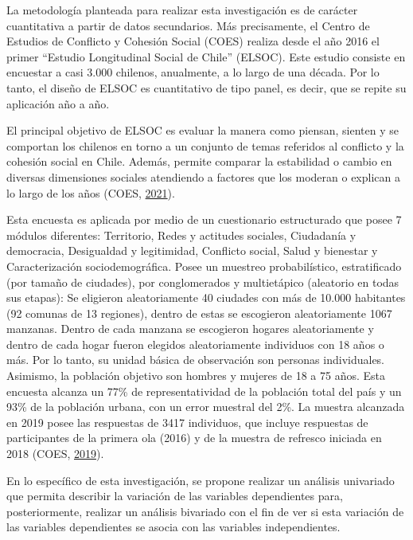 \documentclass[
]{article}
\begin{document}
La metodología planteada para realizar esta investigación es de carácter
cuantitativa a partir de datos secundarios. Más precisamente, el Centro
de Estudios de Conflicto y Cohesión Social (COES) realiza desde el año
2016 el primer ``Estudio Longitudinal Social de Chile'' (ELSOC). Este
estudio consiste en encuestar a casi 3.000 chilenos, anualmente, a lo
largo de una década. Por lo tanto, el diseño de ELSOC es cuantitativo de
tipo panel, es decir, que se repite su aplicación año a año.

El principal objetivo de ELSOC es evaluar la manera como piensan,
sienten y se comportan los chilenos en torno a un conjunto de temas
referidos al conflicto y la cohesión social en Chile. Además, permite
comparar la estabilidad o cambio en diversas dimensiones sociales
atendiendo a factores que los moderan o explican a lo largo de los años
(COES, \protect\hyperlink{ref-coes_Estudio_2021}{2021}).

Esta encuesta es aplicada por medio de un cuestionario estructurado que
posee 7 módulos diferentes: Territorio, Redes y actitudes sociales,
Ciudadanía y democracia, Desigualdad y legitimidad, Conflicto social,
Salud y bienestar y Caracterización sociodemográfica. Posee un muestreo
probabilístico, estratificado (por tamaño de ciudades), por
conglomerados y multietápico (aleatorio en todas sus etapas): Se
eligieron aleatoriamente 40 ciudades con más de 10.000 habitantes (92
comunas de 13 regiones), dentro de estas se escogieron aleatoriamente
1067 manzanas. Dentro de cada manzana se escogieron hogares
aleatoriamente y dentro de cada hogar fueron elegidos aleatoriamente
individuos con 18 años o más. Por lo tanto, su unidad básica de
observación son personas individuales. Asimismo, la población objetivo
son hombres y mujeres de 18 a 75 años. Esta encuesta alcanza un 77\% de
representatividad de la población total del país y un 93\% de la
población urbana, con un error muestral del 2\%. La muestra alcanzada en
2019 posee las respuestas de 3417 individuos, que incluye respuestas de
participantes de la primera ola (2016) y de la muestra de refresco
iniciada en 2018 (COES,
\protect\hyperlink{ref-coes_Radiografia_2019}{2019}).

En lo específico de esta investigación, se propone realizar un análisis
univariado que permita describir la variación de las variables
dependientes para, posteriormente, realizar un análisis bivariado con el
fin de ver si esta variación de las variables dependientes se asocia con
las variables independientes.
\end{document}

